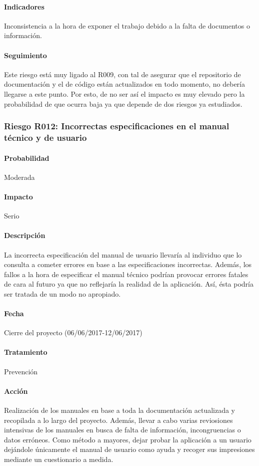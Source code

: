 \documentclass[10pt,a4paper]{article}
\begin{document}
				\paragraph{Indicadores} Inconsistencia a la hora de exponer el trabajo debido a la falta de documentos o información.
				\paragraph{Seguimiento}	Este riesgo está muy ligado al R009, con tal de asegurar que el repositorio de documentación y el de código están actualizados en todo momento, no debería llegarse a este punto. Por esto, de no ser así el impacto es muy elevado pero la probabilidad de que ocurra baja ya que depende de dos riesgos ya estudiados.			
				
			\subsubsection{Riesgo R012: Incorrectas especificaciones en el manual técnico y de usuario}
				\paragraph{Probabilidad} Moderada
				\paragraph{Impacto}	Serio
				\paragraph{Descripción} La incorrecta especificación del manual de usuario llevaría al individuo que lo consulta a cometer errores en base a las especificaciones incorrectas. Además, los fallos a la hora de especificar el manual técnico podrían provocar errores fatales de cara al futuro ya que no reflejaría la realidad de la aplicación. Así, ésta podría ser tratada de un modo no apropiado.
				\paragraph{Fecha} Cierre del proyecto (06/06/2017-12/06/2017)
				\paragraph{Tratamiento} Prevención
				\paragraph{Acción} Realización de los manuales en base a toda la documentación actualizada y recopilada a lo largo del proyecto. Además, llevar a cabo varias reviosiones intensivas de los manuales en busca de falta de información, incongruencias o datos erróneos. Como método a mayores, dejar probar la aplicación a un usuario dejándole únicamente el manual de usuario como ayuda y recoger sus impresiones mediante un cuestionario a medida.
\end{document}
